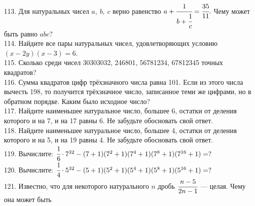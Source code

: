 \documentclass[12pt]{article}
\begin{document}
\begin{figure}[ht!]
\end{figure}\\
113. Для натуральных чисел $a,\ b,\ c$ верно равенство $a+\cfrac{1}{b+\cfrac{1}{c}}=\cfrac{35}{11}.$ Чему может быть равно $abc?$\\
114. Найдите все пары натуральных чисел, удовлетворяющих условию $(x-2y)(x-3)=6.$\\
115. Сколько среди чисел 30303032, 246801, 56781234, 67812345 точных квадратов?\\
116. Сумма квадратов цифр трёхзначного числа равна 101. Если из этого числа вычесть 198, то получится трёхзначное число, записанное теми же цифрами, но в обратном порядке. Каким было исходное число?\\
117. Найдите наименьшее натуральное число, большее 6, остатки от деления которого и на 7, и на 17 равны 6. Не забудьте обосновать свой ответ.\\
118. Найдите наименьшее натуральное число, большее 4, остатки от деления которого и на 5, и на 19 равны 4. Не забудьте обосновать свой ответ.\\
119. Вычислите: $\cfrac{1}{6}\cdot 7^{32}-(7+1)(7^2+1)(7^4+1)(7^8+1)(7^{16}+1)=?$\\
120. Вычислите: $\cfrac{1}{4}\cdot 5^{32}-(5+1)(5^2+1)(5^4+1)(5^8+1)(5^{16}+1)=?$\\
121. Известно, что для некоторого натурального $n$ дробь $\cfrac{n - 5}{2n - 1}$ --- целая. Чему она может быть
\end{document}
